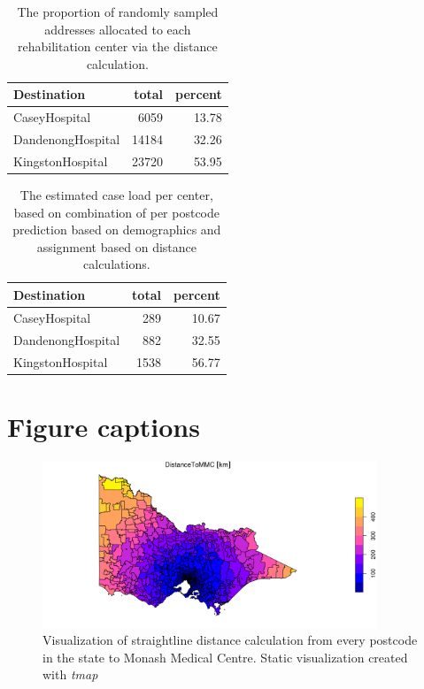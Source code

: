 \documentclass[utf8]{frontiersHLTH}
\begin{document}
\begin{table}[h]
\begin{tabular}{l|r|r}
\hline
Destination & total & percent\\
\hline
CaseyHospital & 6059 & 13.78\\
\hline
DandenongHospital & 14184 & 32.26\\
\hline
KingstonHospital & 23720 & 53.95\\
\hline
\end{tabular}

\caption{The proportion of randomly sampled addresses allocated to each rehabilitation center via the distance calculation.\label{tab:rehabrandomassignment}}
\end{table}

\begin{table}[h]
\begin{tabular}{l|r|r}
\hline
Destination & total & percent\\
\hline
CaseyHospital & 289 & 10.67\\
\hline
DandenongHospital & 882 & 32.55\\
\hline
KingstonHospital & 1538 & 56.77\\
\hline
\end{tabular}
\caption{The estimated case load per center, based on combination of per postcode prediction based on demographics and assignment based on distance calculations.\label{tab:rehabcaselaod}}
\end{table}

\section*{Figure captions}

\begin{figure}[h!]
\begin{center}
\includegraphics[width=10cm]{distance_mmc.png}
\end{center}
\caption{Visualization of straightline distance calculation from every postcode in the state to Monash Medical Centre. Static visualization created with {\em tmap}}\label{fig:DistanceToMMC}
\end{figure}
\end{document}
